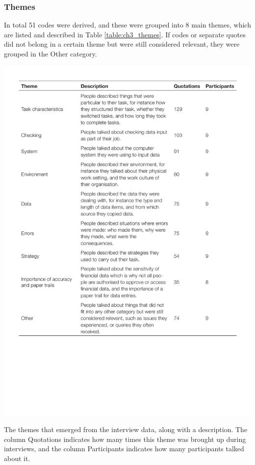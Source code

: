 
\subsubsection{Themes}
In total 51 codes were derived, and these were grouped into 8 main themes, which are listed and described in Table \ref{table:ch3_themes}. If codes or separate quotes did not belong in a certain theme but were still considered relevant, they were grouped in the Other category. 

\begin{table}[htp]
\centering
\includegraphics[width=\textwidth]{images/ch12/ch12-1_Themes.pdf}
    \caption[Study 1 interview themes]{The themes that emerged from the interview data, along with a description. The column Quotations indicates how many times this theme was brought up during interviews, and the column Participants indicates how many participants talked about it.}
    \label{table:ch3_themes}
\end{table}

